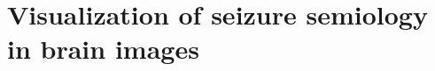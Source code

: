 \chapter[Visualization of seizure semiology in brain images]{Visualization of seizure semiology in brain images}

\label{chap:svt}
\minitoc


\doublespacing

\onehalfspacing %
